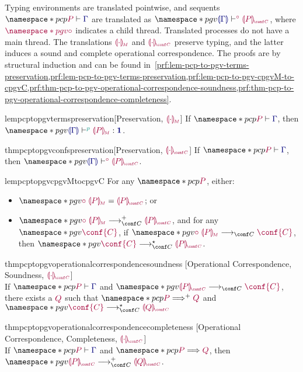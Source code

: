 \documentclass[main.tex]{subfiles}
\begin{document}
Typing environments are translated pointwise, and sequents $\pcp{\seq{P}{\ty{\Gamma}}}$ are translated as $\pgv{\cseq[\child]{\ty{\cpgvT{\ty{\Gamma}}}}{\cpgvC{P}}}$, where $\tm{\pgv{\child}}$ indicates a child thread. Translated processes do not have a main thread.
The translations $\tm{\cpgvM{\cdot}}$ and $\tm{\cpgvC{\cdot}}$ preserve typing, and the latter induces a sound and complete operational correspondence. The proofs are by structural induction and can be found in~\cref{prf:lem-pcp-to-pgv-terms-preservation,prf:lem-pcp-to-pgv-terms-preservation,prf:lem-pcp-to-pgv-cpgvM-to-cpgvC,prf:thm-pcp-to-pgv-operational-correspondence-soundness,prf:thm-pcp-to-pgv-operational-correspondence-completeness}.
\begin{compacttheorems}
  \begin{restatablelemma}{lempcptopgvtermspreservation}[Preservation, ${\tm{\cpgvM{\cdot}}}$]%
    \label{lem:pcp-to-pgv-terms-preservation}
    If $\pcp{\seq{P}{\ty{\Gamma}}}$, then $\pgv{\tseq[\cs{p}]{\ty{\cpgvT{\Gamma}}}{\cpgvM{P}}{\tyunit}}$.
  \end{restatablelemma}
  \begin{restatabletheorem}{thmpcptopgvconfspreservation}[Preservation, ${\tm{\cpgvC{\cdot}}}$]%
    \label{thm:pcp-to-pgv-confs-preservation}
    If $\pcp{\seq{P}{\ty{\Gamma}}}$, then $\pgv{\cseq[\child]{\ty{\cpgvT{\Gamma}}}{\cpgvC{P}}}$.
  \end{restatabletheorem}
  \begin{restatablelemma}{lempcptopgvcpgvMtocpgvC}%
    \label{lem:pcp-to-pgv-cpgvM-to-cpgvC}
    For any $\pcp{\tm{P}}$, either:
    \begin{itemize}
    \item $\pgv{\tm{\child\;\cpgvM{P}}=\tm{\cpgvC{P}}}$; or
    \item   $\pgv{\tm{\child\;\cpgvM{P}}\cred^+\tm{\cpgvC{P}}}$, and for any $\pgv{\tm{\conf{C}}}$, if $\pgv{\tm{\child\;\cpgvM{P}}\cred\tm{\conf{C}}}$, then $\pgv{\tm{\conf{C}}\cred^\star\tm{\cpgvC{P}}}$.
    \end{itemize}
  \end{restatablelemma}
  \begin{restatabletheorem}{thmpcptopgvoperationalcorrespondencesoundness}%
    [Operational Correspondence, Soundness, ${\tm{\cpgvC{\cdot}}}$]%
    \label{thm:pcp-to-pgv-operational-correspondence-soundness}
    \hfill\\%
    If $\pcp{\seq{P}{\ty{\Gamma}}}$ and $\pgv{\tm{\cpgvC{P}}\cred\tm{\conf{C}}}$, there exists a $\tm{Q}$ such that $\pcp{\tm{P}\red^+\tm{Q}}$ and $\pgv{\tm{\conf{C}}\cred^\star\tm{\cpgvC{Q}}}$
  \end{restatabletheorem}
  \begin{restatabletheorem}{thmpcptopgvoperationalcorrespondencecompleteness}%
    [Operational Correspondence, Completeness, ${\tm{\cpgvC{\cdot}}}$]%
    \label{thm:pcp-to-pgv-operational-correspondence-completeness}
    \hfill\\%
    If $\pcp{\seq{P}{\ty{\Gamma}}}$ and $\pcp{\tm{P}\red\tm{Q}}$,
    then $\pgv{\tm{\cpgvC{P}}\cred^+\tm{\cpgvC{Q}}}$.
  \end{restatabletheorem}
\end{compacttheorems}
\endgroup
\end{document}
